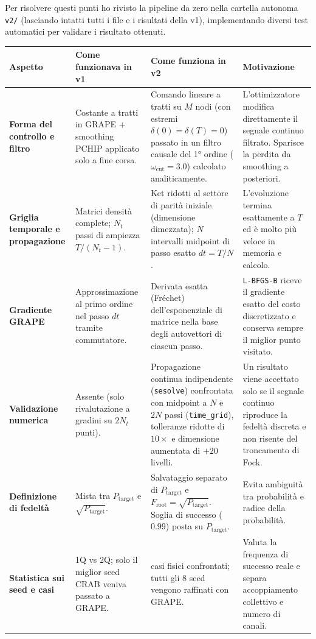 \documentclass[11pt,a4paper]{article}
\begin{document}
Per risolvere questi punti ho rivisto la pipeline da zero nella cartella autonoma \texttt{v2/} (lasciando intatti tutti i file e i risultati della v1), implementando diversi test automatici per validare i risultato ottenuti.
\begin{table}[H]
\centering
\small
\renewcommand{\arraystretch}{1.25}
\begin{tabular}{>{\raggedright\arraybackslash}p{2.6cm} >{\raggedright\arraybackslash}p{3.9cm} >{\raggedright\arraybackslash}p{4.3cm} >{\raggedright\arraybackslash}p{3.5cm}}
\toprule
\textbf{Aspetto} & \textbf{Come funzionava in v1} & \textbf{Come funziona in v2} & \textbf{Motivazione} \\
\midrule
\textbf{Forma del controllo e filtro} & Costante a tratti in GRAPE + smoothing PCHIP applicato solo a fine corsa. & Comando lineare a tratti su $M$ nodi (con estremi $\delta(0)=\delta(T)=0$) passato in un filtro causale del 1° ordine ($\omega_{\text{cut}} = 3.0$) calcolato analiticamente. & L'ottimizzatore modifica direttamente il segnale continuo filtrato. Sparisce la perdita da smoothing a posteriori. \\
\addlinespace
\textbf{Griglia temporale e propagazione} & Matrici densità complete; $N_t$ passi di ampiezza $T/(N_t-1)$. & Ket ridotti al settore di parità iniziale (dimensione dimezzata); $N$ intervalli midpoint di passo esatto $dt = T/N$. & L'evoluzione termina esattamente a $T$ ed è molto più veloce in memoria e calcolo. \\
\addlinespace
\textbf{Gradiente GRAPE} & Approssimazione al primo ordine nel passo $dt$ tramite commutatore. & Derivata esatta (Fréchet) dell'esponenziale di matrice nella base degli autovettori di ciascun passo. & \texttt{L-BFGS-B} riceve il gradiente esatto del costo discretizzato e conserva sempre il miglior punto visitato. \\
\addlinespace
\textbf{Validazione numerica} & Assente (solo rivalutazione a gradini su $2 N_t$ punti). & Propagazione continua indipendente (\texttt{sesolve}) confrontata con midpoint a $N$ e $2N$ passi (\texttt{time\_grid}), tolleranze ridotte di $10\times$ e dimensione aumentata di $+20$ livelli. & Un risultato viene accettato solo se il segnale continuo riproduce la fedeltà discreta e non risente del troncamento di Fock. \\
\addlinespace
\textbf{Definizione di fedeltà} & Mista tra $P_{\text{target}}$ e $\sqrt{P_{\text{target}}}$. & Salvataggio separato di $P_{\text{target}}$ e $F_{\text{root}} = \sqrt{P_{\text{target}}}$. Soglia di successo ($0.99$) posta su $P_{\text{target}}$. & Evita ambiguità tra probabilità e radice della probabilità. \\
\addlinespace
\textbf{Statistica sui seed e casi} & 1Q vs 2Q; solo il miglior seed CRAB veniva passato a GRAPE. & 5 casi fisici confrontati; tutti gli 8 seed vengono raffinati con GRAPE. & Valuta la frequenza di successo reale e separa accoppiamento collettivo e numero di canali. \\
\bottomrule
\end{tabular}
\end{table}
\end{document}

